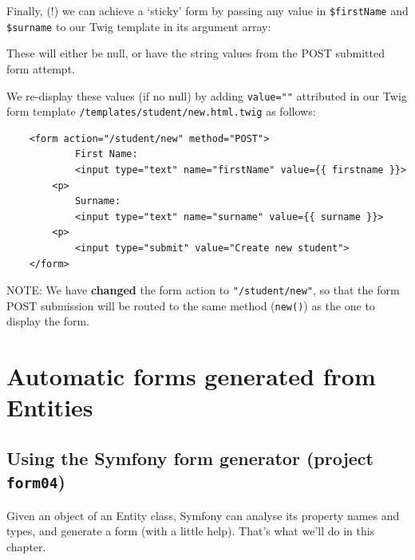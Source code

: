 \documentclass[a4paperpaper,openright]{book}
\newenvironment{Shaded}{}{}
\newcommand{\KeywordTok}[1]{\textcolor[rgb]{0.00,0.44,0.13}{\textbf{#1}}}
\newcommand{\NormalTok}[1]{#1}
\newcommand{\OtherTok}[1]{\textcolor[rgb]{0.00,0.44,0.13}{#1}}
\newcommand{\StringTok}[1]{\textcolor[rgb]{0.25,0.44,0.63}{#1}}
\begin{document}
Finally, (!) we can achieve a `sticky' form by passing any value in
\texttt{\$firstName} and \texttt{\$surname} to our Twig template in its
argument array:

\begin{Shaded}
\end{Shaded}

These will either be null, or have the string values from the POST
submitted form attempt.

We re-display these values (if no null) by adding \texttt{value=""}
attributed in our Twig form template
\texttt{/templates/student/new.html.twig} as follows:

\begin{verbatim}
    <form action="/student/new" method="POST">
            First Name:
            <input type="text" name="firstName" value={{ firstname }}>
        <p>
            Surname:
            <input type="text" name="surname" value={{ surname }}>
        <p>
            <input type="submit" value="Create new student">
    </form>
\end{verbatim}

NOTE: We have \textbf{changed} the form action to
\texttt{"/student/new"}, so that the form POST submission will be routed
to the same method (\texttt{new()}) as the one to display the form.

\hypertarget{automatic-forms-generated-from-entities}{%
\chapter{Automatic forms generated from
Entities}\label{automatic-forms-generated-from-entities}}

\hypertarget{using-the-symfony-form-generator-project-form04}{%
\section{\texorpdfstring{Using the Symfony form generator (project
\texttt{form04})}{Using the Symfony form generator (project form04)}}\label{using-the-symfony-form-generator-project-form04}}

Given an object of an Entity class, Symfony can analyse its property
names and types, and generate a form (with a little help). That's what
we'll do in this chapter.
\end{document}

